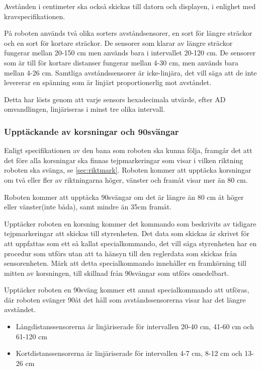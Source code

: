 Avstånden i centimeter ska också skickas till datorn och displayen, i enlighet med
kravspecifikationen.

På roboten används två olika sorters avståndsensorer, en sort för längre sträckor och en sort för
kortare sträckor. De sensorer som klarar av längre sträckor fungerar mellan 20-150 cm men 
används bara i intervallet 20-120 cm. De sensorer som är till för kortare distanser fungerar mellan 4-30 cm,
 men används bara mellan 4-26 cm. Samtliga avståndssensorer är icke-linjära, det vill säga att de 
 inte levererar en spänning som är linjärt proportionerlig mot avståndet.

Detta har lösts genom att varje sensors hexadecimala utvärde, efter AD omvandlingen, linjäriseras i minst 
tre olika intervall.

\subsubsection{Upptäckande av korsningar och 90\degree svängar}
\label{sec:upptackkorsning}
Enligt specifikationen av den bana som roboten ska kunna följa, framgår det 
att det före alla korsningar ska finnas tejpmarkeringar som visar i vilken 
riktning roboten ska svänga, se \ref{sec:riktmark}. Roboten kommer att 
upptäcka korsningar om två eller fler av riktningarna höger, vänster och framåt visar 
mer än 80 cm.

Roboten kommer att upptäcka 90\degree svängar om det är längre än 80 cm åt 
höger eller vänster(inte båda), samt mindre än 35cm framåt.

Upptäcker roboten en korsning kommer det kommando som beskrivits av tidigare 
tejpmarkeringar att skickas till styrenheten. Det data som skickas är skrivet 
för att uppfattas som ett så kallat specialkommando, det vill säga 
styrenheten har en procedur som utförs utan att ta hänsyn till den reglerdata 
som skickas från sensorenheten. Märk att detta specialkommando innehåller en 
framkörning till mitten av korsningen, till skillnad från 90\degree svängar 
som utförs omedelbart.

Upptäcker roboten en 90\degree sväng kommer ett annat specialkommando att 
utföras, där roboten svänger 90\degree åt det håll som avståndssensorerna 
visar har det längre avståndet.

\begin{itemize}
\item Långdistanssensorerna är linjäriserade för intervallen 20-40 cm, 41-60 cm och 61-120 cm
\item Kortdistanssensorerna är linjäriserade för intervallen 4-7 cm, 8-12 cm och 13-26 cm
\end{itemize}
 

